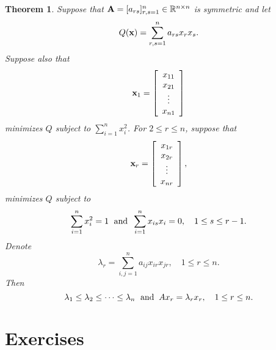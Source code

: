 \documentclass{article}
\newtheorem{theorem}{Theorem}
\begin{document}
\begin{theorem}\label{theorem:4}
Suppose that ${\bf A}=[a_{rs}]_{r,s=1}^{n}\in {\mathbb R}^{n\times n}$ is
symmetric and let
$$
Q({\bf x})=\sum_{r,s=1}^{n}a_{rs}x_{r}x_{s}.
$$
  Suppose    also
that
$$
{\bf x}_{1}=
\left[\begin{array}{ccccccc}
x_{11}\\x_{21}\\\vdots\\x_{n1}
\end{array}\right]
$$
 minimizes $Q$  subject to  $\sum_{i=1}^{n}x_{i}^{2}$. For $2\le r\le n$,
suppose  that
$$
{\bf x}_{r}=
\left[\begin{array}{ccccccc}
x_{1r}\\x_{2r}\\\vdots\\x_{nr}
\end{array}\right],
$$
 minimizes $Q$ subject to
$$
\sum_{i=1}^{n}x_{i}^{2} =1 \text{\; and\;\;}
\sum_{i=1}^{n}x_{is}x_{i}=0,\quad 1\le s\le r-1.
$$
Denote
$$
\lambda_{r}=\sum_{i,j=1}^{n}a_{ij}x_{ir}x_{jr}, \quad 1\le r\le n.
$$
Then
$$
\lambda_{1}\le \lambda_{2}\le \cdots\le \lambda_{n}
\text{\; and\;\;}   Ax_{r}=\lambda_{r}x_{r},\quad 1\le r\le n.
$$
\end{theorem}

\newpage
\section{Exercises} \label{section:7}
\end{document}
